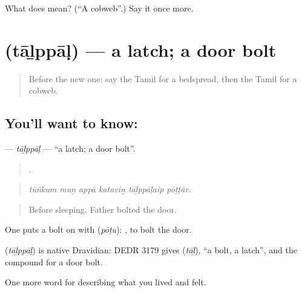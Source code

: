 \begin{tcolorbox}[breakable,colback=teal!4,colframe=teal!35!black,title={Before you move on}]
What does  mean? (\textquotedblleft{}A cobweb\textquotedblright{}.) Say it once more.
\end{tcolorbox}
\section[\texorpdfstring{\ta{தாழ்ப்பாள்} (tāḻppāḷ)}{தாழ்ப்பாள் (tāḻppāḷ)}]{ (tāḻppāḷ) — a latch; a door bolt}

\label{lesson:TA-C521-talppal}



\begin{quote}
Before the new one: say the Tamil for a bedspread, then the Tamil for a cobweb.
\end{quote}

\subsection*{You'll want to know: }
\textbf{} — \emph{tāḻppāḷ} — \textquotedblleft{}a latch; a door bolt\textquotedblright{}.

\begin{quote}
     .
\end{quote}

\begin{quote}
\emph{tūṅkum muṉ appā kataviṉ tāḻppāḷaip pōṭṭār.}
\end{quote}

\begin{quote}
Before sleeping, Father bolted the door.
\end{quote}

One puts a bolt on with  (\emph{pōṭu}):  , to bolt the door.

\begin{cousinweb}
\textbf{} (\emph{tāḻppāḷ}) is native Dravidian: DEDR 3179 gives  (\emph{tāḻ}), \textquotedblleft{}a bolt, a latch\textquotedblright{}, and the compound  for a door bolt.
\end{cousinweb}

\begin{grammarlens}[title={What you've built}]
One more word for describing what you lived and felt.
\end{grammarlens}

